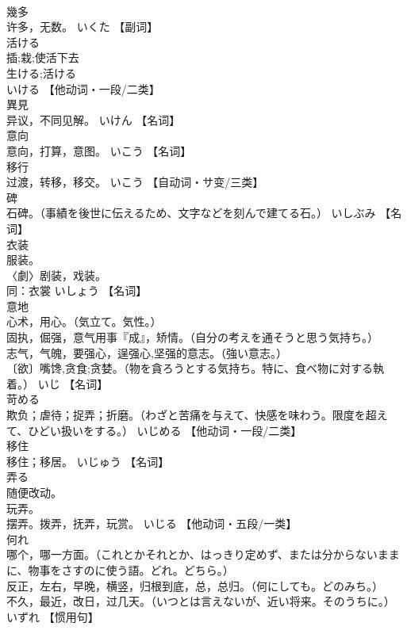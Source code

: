 \documentclass[8pt]{extreport}
\begin{document}
\begin{CJK}{UTF8}{min}
\\	幾多	
\\	许多，无数。	いくた		【副词】
\\	活ける	
\\	插;栽;使活下去 
\\	生ける;活ける 
\\	いける		【他动词・一段/二类】
\\	異見	
\\	异议，不同见解。	いけん		【名词】
\\	意向	
\\	意向，打算，意图。	いこう		【名词】
\\	移行	
\\	过渡，转移，移交。	いこう		【自动词・サ变/三类】
\\	碑	
\\	石碑。（事績を後世に伝えるため、文字などを刻んで建てる石。）	いしぶみ		【名词】
\\	衣装	
\\	服装。 
\\	〈劇〉剧装，戏装。 
\\	同：衣裳	いしょう		【名词】
\\	意地	
\\	心术，用心。（気立て。気性。） 
\\	固执，倔强，意气用事『成』，矫情。（自分の考えを通そうと思う気持ち。） 
\\	志气，气魄，要强心，逞强心,坚强的意志。（強い意志。） 
\\	〔欲〕嘴馋,贪食;贪婪。（物を貪ろうとする気持ち。特に、食べ物に対する執着。）	いじ		【名词】
\\	苛める	
\\	欺负；虐待；捉弄；折磨。（わざと苦痛を与えて、快感を味わう。限度を超えて、ひどい扱いをする。）	いじめる		【他动词・一段/二类】
\\	移住	
\\	移住；移居。	いじゅう		【名词】
\\	弄る	
\\	随便改动。 
\\	玩弄。 
\\	摆弄。拨弄，抚弄，玩赏。	いじる		【他动词・五段/一类】
\\	何れ	
\\	哪个，哪一方面。（これとかそれとか、はっきり定めず、または分からないままに、物事をさすのに使う語。どれ。どちら。） 
\\	反正，左右，早晚，横竖，归根到底，总，总归。（何にしても。どのみち。） 
\\	不久，最近，改日，过几天。（いつとは言えないが、近い将来。そのうちに。）	いずれ		【惯用句】

\end{CJK}
\end{document}
